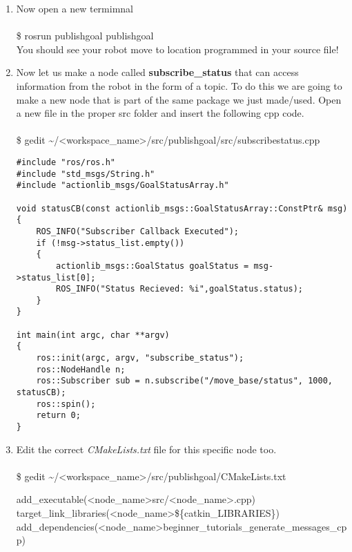 \documentclass[12pt]{article}
\newcommand{\R}{\color{red}}
\newcommand{\K}{\color{black}}
\newcommand{\PR}{\color{mypurple}}
\newcommand{\wspname}{\R<workspace\_name>\K}
\newcommand{\nodname}{\PR<node\_name>\K}
\newcommand{\home}{\textasciitilde/}
\begin{document}
\begin{enumerate}
\item Now open a new termimnal\\\\
{\selectfont  \hspace{5mm} \$ rosrun publish\textunderscore goal publish\textunderscore goal}\\
     
     You should see your robot move to location programmed in your source file!
 
 \newpage    
     
\item Now let us make a node called {\bf subscribe\_status} that can access information from the robot in the form of a topic. To do this we are going to make a new node that is part of the same package we just made/used. Open a new file in the proper src folder and insert the following cpp code.\\\\ 
{\selectfont  \hspace{5mm} \$ gedit \home\wspname/src/publish\textunderscore goal/src/subscribe\textunderscore status.cpp  }
         
         \begin{lstlisting}
#include "ros/ros.h"
#include "std_msgs/String.h"
#include "actionlib_msgs/GoalStatusArray.h"

void statusCB(const actionlib_msgs::GoalStatusArray::ConstPtr& msg)
{
    ROS_INFO("Subscriber Callback Executed");
    if (!msg->status_list.empty())
    {
        actionlib_msgs::GoalStatus goalStatus = msg->status_list[0];
        ROS_INFO("Status Recieved: %i",goalStatus.status);  
    }
}

int main(int argc, char **argv)
{
    ros::init(argc, argv, "subscribe_status");
    ros::NodeHandle n;
    ros::Subscriber sub = n.subscribe("/move_base/status", 1000, statusCB);
    ros::spin();
    return 0;
}
    \end{lstlisting}
    
    \item Edit the correct {\it CMakeLists.txt} file for this specific node too. \\\\
 {\selectfont  \hspace{5mm} \$ gedit \home\wspname/src/publish\textunderscore goal/CMakeLists.txt }
 
 {\selectfont add\_executable(\nodname\hspace{3mm}src/\nodname.cpp) } \\
{\selectfont target\_link\_libraries(\nodname \hspace{3mm}\$\{catkin\_LIBRARIES\}) } \\
{\selectfont add\_dependencies(\nodname \hspace{3mm}beginner\_tutorials\_generate\_messages\_cpp) }\\
 

\end{enumerate}
\end{document}
